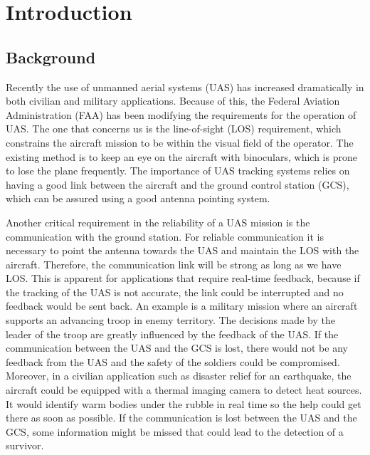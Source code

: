 \chapter{Introduction}
\label{ch:introduction}

\section{Background}
Recently the use of unmanned aerial systems (UAS) has increased dramatically in both civilian and military applications. Because of this, the Federal Aviation Administration (FAA) has been modifying the requirements for the operation of UAS. The one that concerns us is the line-of-sight (LOS) requirement, which constrains the aircraft mission to be within the visual field of the operator. The existing method is to keep an eye on the aircraft with binoculars, which is prone to lose the plane frequently. The importance of UAS tracking systems relies on having a good link between the aircraft and the ground control station (GCS), which can be assured using a good antenna pointing system.

Another critical requirement in the reliability of a UAS mission is the communication with the ground station. For reliable communication it is necessary to point the antenna towards the UAS and maintain the LOS with the aircraft. Therefore, the communication link will be strong as long as we have LOS. This is apparent for applications that require real-time feedback, because if the tracking of the UAS is not accurate, the link could be interrupted and no feedback would be sent back. An example is a military mission where an aircraft supports an advancing troop in enemy territory.  The decisions made by the leader of the troop are greatly influenced by the feedback of the UAS. If the communication between the UAS and the GCS is lost, there would not be any feedback from the UAS and the safety of the soldiers could be compromised. Moreover, in a civilian application such as disaster relief for an earthquake, the aircraft could be equipped with a thermal imaging camera to detect heat sources. It would identify warm bodies under the rubble in real time so the help could get there as soon as possible. If the communication is lost between the UAS and the GCS, some information might be missed that could lead to the detection of a survivor.

